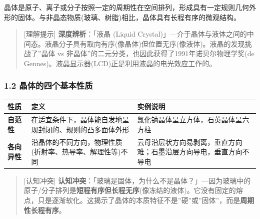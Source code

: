 晶体是原子、离子或分子按照一定的周期性在空间排列，形成具有一定规则几何外形的固体。与非晶态物质(玻璃、树脂)相比，晶体具有长程有序的微观结构。

\begin{quote}
{[}理解提示{]} \textbf{深度辨析}：「液晶 (Liquid Crystal)」---介于晶体与液体之间的中间态。液晶分子具有取向有序(像晶体)但位置无序(像液体)。液晶的发现挑战了''晶体 vs 非晶体''的二元分类，也因此获得了1991年诺贝尔物理学奖(de Gennes)。液晶显示器(LCD)正是利用液晶的电光效应工作的。
\end{quote}

\subsubsection{1.2 晶体的四个基本性质}\label{ux6676ux4f53ux7684ux56dbux4e2aux57faux672cux6027ux8d28}

{\def\LTcaptype{none} %
\begin{longtable}[]{@{}
  >{\raggedright\arraybackslash}p{}
  >{\raggedright\arraybackslash}p{}
  >{\raggedright\arraybackslash}p{}@{}}
\toprule\noalign{}
\begin{minipage}[b]{\linewidth}\raggedright
性质
\end{minipage} & \begin{minipage}[b]{\linewidth}\raggedright
定义
\end{minipage} & \begin{minipage}[b]{\linewidth}\raggedright
实例说明
\end{minipage} \\
\midrule\noalign{}
\endhead
\bottomrule\noalign{}
\endlastfoot
\textbf{自范性} & 在适宜条件下，晶体能自发地呈现封闭的、规则的凸多面体外形 & 氯化钠晶体呈立方体，石英晶体呈六方柱 \\
\textbf{各向异性} & 沿晶体的不同方向，物理性质(折射率、热导率、解理性等)不同 & 云母沿层状方向易剥离，垂直方向难；石墨沿层方向导电，垂直方向不导电 \\
\end{longtable}
}

\begin{quote}
{[}认知冲突{]} \textbf{认知冲突}：「玻璃是固体，为什么不是晶体？」---因为玻璃中的原子/分子排列是\textbf{短程有序但长程无序}(像冻结的液体)。它没有固定的熔点，只是逐渐软化。这揭示了晶体的本质特征不是''硬''或''固体''，而是\textbf{周期性长程有序}。
\end{quote}

